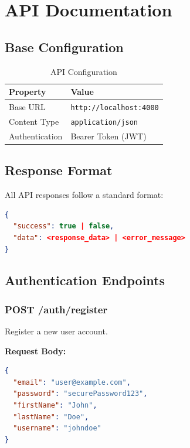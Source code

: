 \documentclass[12pt,a4paper]{report}
\begin{document}
\chapter{API Documentation}

\section{Base Configuration}

\begin{table}[H]
\centering
\begin{tabularx}{\textwidth}{|l|X|}
\hline
\textbf{Property} & \textbf{Value} \\
\hline
Base URL & \texttt{http://localhost:4000} \\
\hline
Content Type & \texttt{application/json} \\
\hline
Authentication & Bearer Token (JWT) \\
\hline
\end{tabularx}
\caption{API Configuration}
\end{table}

\section{Response Format}

All API responses follow a standard format:

\begin{lstlisting}[language=json, caption=Standard API Response]
{
  "success": true | false,
  "data": <response_data> | <error_message>
}
\end{lstlisting}

\section{Authentication Endpoints}

\subsection{POST /auth/register}

Register a new user account.

\textbf{Request Body:}
\begin{lstlisting}[language=json]
{
  "email": "user@example.com",
  "password": "securePassword123",
  "firstName": "John",
  "lastName": "Doe",
  "username": "johndoe"
}
\end{lstlisting}
\end{document}
